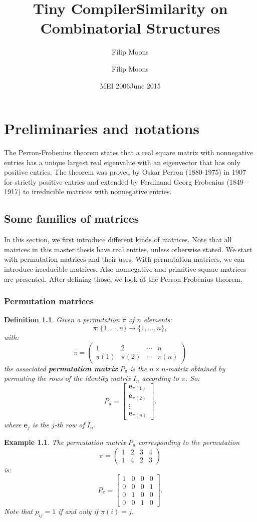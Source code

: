\documentclass[a4paper,11pt]{report}
\author{Filip Moons}
\title{Tiny Compiler}
\author{Filip Moons}
\title{Similarity on Combinatorial Structures}
\date{MEI 2006}
\date{June 2015}
\newtheorem{example}[theorem]{Example}
\newtheorem{definition}[theorem]{Definition}
\begin{document}
\maketitlepage


\tableofcontents
\newpage
\chapter{Preliminaries and notations}


The Perron-Frobenius theorem states that a real square matrix with nonnegative entries has a unique largest real eigenvalue with an eigenvector 
that has only positive entries. The theorem was proved by Oskar 
Perron (1880-1975) in 1907 for strictly positive entries and extended by 
Ferdinand Georg Frobenius (1849-1917) to irreducible matrices with nonnegative 
entries. 

\section{Some families of matrices}
In this section, we first introduce different kinds of matrices. Note that all matrices in this master thesis have real entries,
unless otherwise stated. We start with permutation matrices and their uses. 
With permutation matrices, we can introduce irreducible matrices. Also nonnegative and primitive square matrices are presented. After defining 
those, we look at the Perron-Frobenius theorem. 
\subsection{Permutation matrices}
\begin{definition}
  Given a permutation $\pi$ of $n$ elements:
  $$\pi: \{1,\ldots,n\} \to \{1,\ldots,n\},$$
  with:
    $$\pi = \begin{pmatrix} 1 & 2 & \cdots & n \\ \pi(1) & \pi(2) & \cdots & \pi(n) \end{pmatrix} $$
  the associated \textbf{permutation matrix} $P_\pi$ is the $n\times n$-matrix 
  obtained by permuting the rows of the identity matrix $I_n$ according to $\pi$. 
  So:
 $$P_\pi = \begin{bmatrix} 
\mathbf{e}_{\pi(1)}  \\
\mathbf{e}_{\pi(2)}  \\
\vdots  \\
\mathbf{e}_{\pi(n)}  
\end{bmatrix}.$$
 where $\mathbf{e}_{j}$ is the $j$-th row of $I_n$.
 \end{definition}
\begin{example}
  The permutation matrix $P_\pi$ corresponding to the permutation  $$\pi = \begin{pmatrix} 1 & 2 & 3 & 4 \\ 1 & 4 & 2 & 3 \end{pmatrix} $$
  is:
  $$P_\pi = \begin{bmatrix} 
1 & 0 & 0 & 0  \\
0 & 0 & 0 & 1  \\
0 & 1 & 0 & 0  \\
0 & 0 & 1 & 0  
\end{bmatrix}.$$
Note that $p_{ij} = 1$ if and only if $\pi(i) = j$. 
\end{example}
\end{document}
